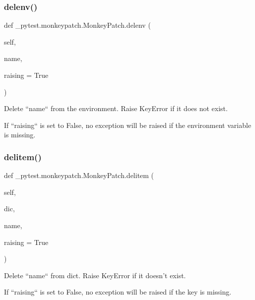 \subsubsection{\texorpdfstring{delenv()}{delenv()}}
{\footnotesize\ttfamily def \+\_\+pytest.\+monkeypatch.\+Monkey\+Patch.\+delenv (\begin{DoxyParamCaption}\item[{}]{self,  }\item[{}]{name,  }\item[{}]{raising = {\ttfamily True} }\end{DoxyParamCaption})}

\begin{DoxyVerb}Delete ``name`` from the environment. Raise KeyError if it does
not exist.

If ``raising`` is set to False, no exception will be raised if the
environment variable is missing.
\end{DoxyVerb}
 \mbox{\label{class__pytest_1_1monkeypatch_1_1_monkey_patch_a8e8bae3db12d84514a9992f01e800d90}} 
\subsubsection{\texorpdfstring{delitem()}{delitem()}}
{\footnotesize\ttfamily def \+\_\+pytest.\+monkeypatch.\+Monkey\+Patch.\+delitem (\begin{DoxyParamCaption}\item[{}]{self,  }\item[{}]{dic,  }\item[{}]{name,  }\item[{}]{raising = {\ttfamily True} }\end{DoxyParamCaption})}

\begin{DoxyVerb}Delete ``name`` from dict. Raise KeyError if it doesn't exist.

If ``raising`` is set to False, no exception will be raised if the
key is missing.
\end{DoxyVerb}
 \mbox{\label{class__pytest_1_1monkeypatch_1_1_monkey_patch_a5907e4038adc542852aa11669c75d735}} 
